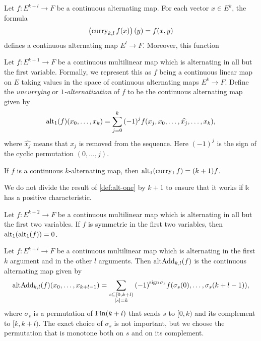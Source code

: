 \begin{definition}%
  \label{def:cont-alt-curry-fin-add}
  Let \(f\colon E^{k + l} \to F\) be a continuous alternating map.
  For each vector \(x \in E^{k}\), the formula
  \[
    \left(\operatorname{curry}_{k,l} f(x)\right)(y) = f(x, y)
  \]
  defines a continuous alternating map \(E^{l}\to F\).
  Moreover, this function 
\end{definition}

\begin{definition}%
  \label{def:alt-one}
  Let \(f\colon E^{k + 1}\to F\) be a continuous multilinear map which is alternating in all but the first variable.
  Formally, we represent this as \(f\) being a continuous linear map on \(E\) taking values in the space of continuous alternating maps \(E^{k}\to F\).
  Define the \emph{uncurrying} or \emph{\(1\)-alternatization} of \(f\) to be the continuous alternating map given by
  \[
    \operatorname{alt_1}(f)(x_{0}, \dots, x_{k}) = \sum_{j=0}^{k}{(-1)}^{j}f(x_{j}, x_{0}, \dots, \widehat{x_{j}}, \dots, x_{k}),
  \]
  where \(\widehat{x_{j}}\) means that \(x_{j}\) is removed from the sequence.
  Here \({(-1)}^{j}\) is the sign of the cyclic permutation \((0, \dots, j)\).
\end{definition}

\begin{theorem}%
  \label{thm:uncurry-curry-one}
  If \(f\) is a continuous \(k\)-alternating map, then \(\operatorname{alt_1}(\operatorname{curry_1} f) = (k + 1)f\).
\end{theorem}

\begin{remark}
  We do not divide the result of \autoref{def:alt-one} by \(k + 1\)
  to ensure that it works if \(\mathbb k\) has a positive characteristic.%
\end{remark}

\begin{theorem}%
  \label{thm:uncurry2-eq-zero}
  Let \(f\colon E^{k + 2}\to F\) be a continuous multilinear map which is alternating in all but the first two variables.
  If \(f\) is symmetric in the first two variables, then \(\operatorname{alt_1}(\operatorname{alt_1}(f)) = 0\).
\end{theorem}


\begin{definition}%
  \label{def:uncurry-fin-add}
  Let \(f\colon E^{k + l}\to F\) be a continuous multilinear map
  which is alternating in the first \(k\) argument and in the other \(l\) arguments.
  Then \(\operatorname{altAdd}_{k,l}(f)\) is the continuous alternating map given by
  \[
    \operatorname{altAdd}_{k,l}(f)(x_{0}, \dots, x_{k + l - 1})=\sum_{\substack{s\subseteq [0, k + l)\\|s|=k}}{(-1)}^{\operatorname{sign} \sigma_{s}}f(\sigma_{s}(0), \dots, \sigma_{s}(k + l - 1)),
  \]
  where \(\sigma_{s}\) is a permutation of \(\operatorname{Fin} (k + l)\) that sends \(s\) to \([0, k)\) and its complement to \([k, k + l)\).
  The exact choice of \(\sigma_{s}\) is not important, but we choose the permutation that is monotone both on \(s\) and on its complement.
\end{definition}

